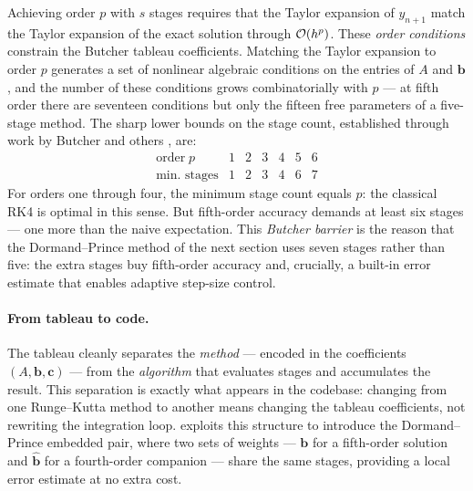 Achieving order $p$ with $s$ stages requires that the Taylor
expansion of $y_{n+1}$ match the Taylor expansion of the exact
solution through $\mathcal{O}\!\left(h^p\right)$.  These \emph{order conditions}
constrain the Butcher tableau coefficients.  Matching the Taylor
expansion to order $p$ generates a set of nonlinear algebraic
conditions on the entries of $A$ and $\mathbf{b}$, and the number
of these conditions grows combinatorially with $p$ --- at fifth order
there are seventeen conditions but only the fifteen free parameters
of a five-stage method.  The sharp lower bounds on the stage count,
established through work by Butcher and others
\cite{HairerNorsettWanner1993}, are:
%
\begin{equation}
  \renewcommand{\arraystretch}{1.2}
  \begin{array}{l|cccccc}
    \text{order}\; p & 1 & 2 & 3 & 4 & 5 & 6 \\
    \hline
    \text{min.\ stages} & 1 & 2 & 3 & 4 & 6 & 7
  \end{array}
  \label{eq:butcher-barrier}
\end{equation}
%
For orders one through four, the minimum stage count equals $p$: the
classical RK4 is optimal in this sense.  But fifth-order accuracy
demands at least six stages --- one more than the naive expectation.
This \emph{Butcher barrier} is the reason that the Dormand--Prince
method of the next section uses seven stages rather than five: the
extra stages buy fifth-order accuracy and, crucially, a built-in error
estimate that enables adaptive step-size control.

\paragraph{From tableau to code.}

The tableau cleanly separates the \emph{method} --- encoded in
the coefficients $(A, \mathbf{b}, \mathbf{c})$ --- from the
\emph{algorithm} that evaluates stages and accumulates the result.  This separation is exactly what appears in the codebase:
changing from one Runge--Kutta method to another means changing
the tableau coefficients, not rewriting the integration loop.
 exploits this structure to introduce
the Dormand--Prince embedded pair, where two sets of weights ---
$\mathbf{b}$ for a fifth-order solution and $\hat{\mathbf{b}}$ for a
fourth-order companion --- share the same stages, providing a local
error estimate at no extra cost.
